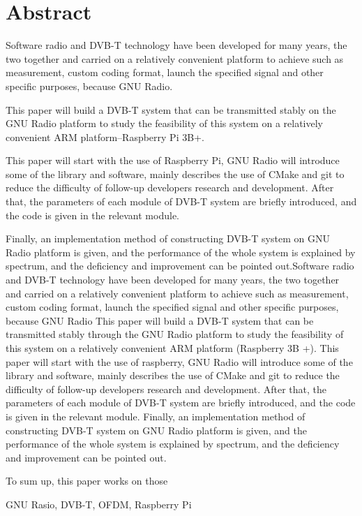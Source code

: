 ﻿%
\renewcommand{\baselinestretch}{1.5}
\fontsize{12pt}{13pt}\selectfont

\chapter*{Abstract}

\par\noindent Software radio and DVB-T technology have been developed for many years, the two together and carried on a relatively convenient platform to achieve such as measurement, custom coding format, launch the specified signal and other specific purposes, because GNU Radio.
\par\noindent This paper will build a DVB-T system that can be transmitted stably on the GNU Radio platform to study the feasibility of this system on a relatively convenient ARM platform--Raspberry Pi 3B+. 
\par\noindent This paper will start with the use of Raspberry Pi, GNU Radio will introduce some of the library and software, mainly describes the use of CMake and git to reduce the difficulty of follow-up developers research and development. After that, the parameters of each module of DVB-T system are briefly introduced, and the code is given in the relevant module. 
\par\noindent Finally, an implementation method of constructing DVB-T system on GNU Radio platform is given, and the performance of the whole system is explained by spectrum, and the deficiency and improvement can be pointed out.Software radio and DVB-T technology have been developed for many years, the two together and carried on a relatively convenient platform to achieve such as measurement, custom coding format, launch the specified signal and other specific purposes, because GNU Radio This paper will build a DVB-T system that can be transmitted stably through the GNU Radio platform to study the feasibility of this system on a relatively convenient ARM platform (Raspberry 3B +). This paper will start with the use of raspberry, GNU Radio will introduce some of the library and software, mainly describes the use of CMake and git to reduce the difficulty of follow-up developers research and development. After that, the parameters of each module of DVB-T system are briefly introduced, and the code is given in the relevant module. Finally, an implementation method of constructing DVB-T system on GNU Radio platform is given, and the performance of the whole system is explained by spectrum, and the deficiency and improvement can be pointed out.

\noindent To sum up, this paper works on those

\vspace{1em}
 \quad GNU Rasio, DVB-T, OFDM, Raspberry Pi

\clearpage
\endinput